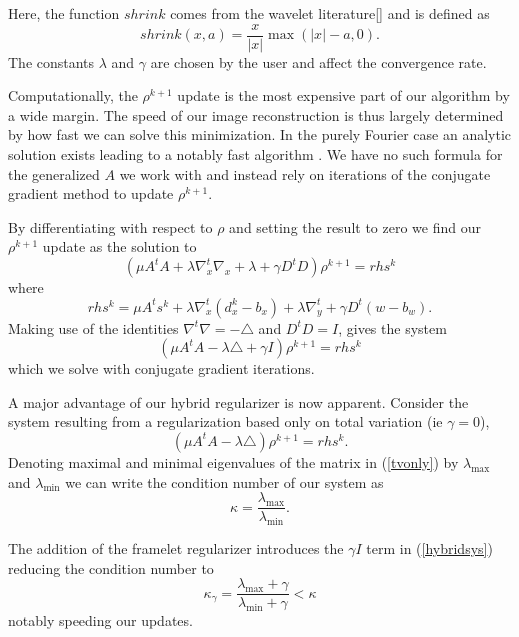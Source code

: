 \documentclass[11pt]{amsart}
\theoremstyle{remark}
\begin{document}
Here, the function $shrink$ comes from the wavelet literature[] and is defined as
\begin{equation}
shrink(x,a) = \frac{x}{|x|} \max (|x|-a,0).
\end{equation}
The constants $\lambda$ and $\gamma$ are chosen by the user and affect the convergence rate.

Computationally, the $\rho^{k+1}$ update is the most expensive part of our algorithm by a wide margin. The speed of our image reconstruction is thus largely determined by how fast we can solve this minimization. In the purely Fourier case an analytic solution exists leading to a notably fast algorithm \cite{Goldstein2009a}. We have no such formula for the generalized $A$ we work with and instead rely on iterations of the conjugate gradient method to update $\rho^{k+1}$.

By differentiating with respect to $\rho$ and setting the result to zero we find our $\rho^{k+1}$ update as the solution to
\begin{equation}
(\mu A^tA + \lambda \nabla_x^t \nabla_x + \lambda + \gamma D^tD )\rho^{k+1} = rhs^k
\end{equation}
where
\begin{equation}
rhs^k = \mu A^t s^k + \lambda \nabla_x ^t (d_x^k - b_x) + \lambda \nabla_y^t + \gamma D^t(w - b_w).
\end{equation}
Making use of the identities $\nabla^t \nabla = - \triangle$ and $D^tD = I$, gives the system
\begin{equation}\label{hybridsys}
(\mu A^tA - \lambda \triangle + \gamma I )\rho^{k+1} = rhs^k
\end{equation}
which we solve with conjugate gradient iterations.

A major advantage of our hybrid regularizer is now apparent. Consider the system resulting from a regularization based only on total variation (ie $\gamma =0$),
\begin{equation}\label{tvonly}
(\mu A^tA - \lambda \triangle)\rho^{k+1} = rhs^k.
\end{equation}
Denoting maximal and minimal eigenvalues of the matrix in (\ref{tvonly}) by $\lambda_{\max}$ and $\lambda_{\min}$ we can write the condition number of our system as
\begin{equation}
\kappa = \frac{\lambda_{\max}}{\lambda_{\min}}.
\end{equation}

The addition of the framelet regularizer introduces the $\gamma I$ term in (\ref{hybridsys}) reducing the condition number to
\begin{equation}
\kappa_\gamma  =  \frac{\lambda_{\max} + \gamma}{\lambda_{\min} + \gamma} < \kappa
\end{equation}
notably speeding our updates.
\end{document}
